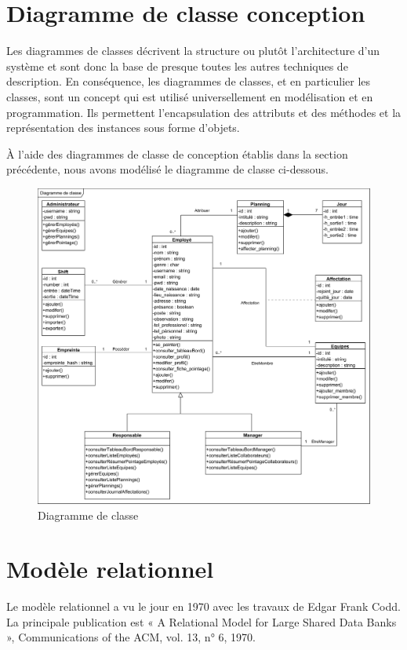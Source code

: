 \section{Diagramme de classe conception}
Les diagrammes de classes décrivent la structure ou plutôt l’architecture d’un
système et sont donc la base de presque toutes les autres techniques de
description. En conséquence, les diagrammes de classes, et en particulier les
classes, sont un concept qui est utilisé universellement en modélisation et en
programmation. Ils permettent l’encapsulation des attributs et des méthodes et
la représentation des instances sous forme d’objets\cite{10}.

À l’aide des diagrammes de classe de conception établis dans la section
précédente, nous avons modélisé le diagramme de classe ci-dessous.

\begin{figure}[h!]
    \centering
    \includegraphics[scale=0.69]{images/DCC/Diagramme de classe.png}
    \caption{Diagramme de classe}
    \label{fig47}
\end{figure}

\section{Modèle relationnel}
Le modèle relationnel a vu le jour en 1970 avec les travaux de Edgar Frank 
Codd. La principale publication est « A Relational Model for Large Shared Data 
Banks », Communications of the ACM, vol. 13, n° 6, 1970.\\

